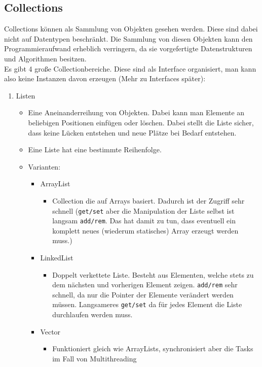 \documentclass{article}
\begin{document}
	\subsection{Collections}
	Collections können als Sammlung von Objekten gesehen werden. Diese sind dabei nicht auf Datentypen beschränkt. Die Sammlung von diesen Objekten kann den Programmieraufwand erheblich verringern, da sie vorgefertigte Datenstrukturen und Algorithmen besitzen. \\
	Es gibt 4 große Collectionbereiche. Diese sind als Interface organisiert, man kann also keine Instanzen davon erzeugen (Mehr zu Interfaces später):
	\begin{enumerate}
		\item{Listen}
		\begin{itemize}
			\item{Eine Aneinanderreihung von Objekten. Dabei kann man Elemente an beliebigen Positionen einfügen oder löschen. Dabei stellt die Liste sicher, dass keine Lücken entstehen und neue Plätze bei Bedarf entstehen.}
			\item{Eine Liste hat eine bestimmte Reihenfolge.}
			\item{Varianten:}
			\begin{itemize}
				\item{ArrayList}
				\begin{itemize}
					\item{Collection die auf Arrays basiert. Dadurch ist der Zugriff sehr schnell (\verb|get/set| aber die Manipulation der Liste selbst ist langsam \verb|add/rem|. Das hat damit zu tun, dass eventuell ein komplett neues (wiederum statisches) Array erzeugt werden muss.)}
				\end{itemize}
				\item{LinkedList}
				\begin{itemize}
					\item{Doppelt verkettete Liste. Besteht aus Elementen, welche stets zu dem nächsten und vorherigen Element zeigen. \verb|add/rem| sehr schnell, da nur die Pointer der Elemente verändert werden müssen. Langsameres \verb|get/set| da für jedes Element die Liste durchlaufen werden muss.}
				\end{itemize}
				\item{Vector}
				\begin{itemize}
					\item{Funktioniert gleich wie ArrayLists, synchronisiert aber die Tasks im Fall von Multithreading}
				\end{itemize}

\end{itemize}
\end{itemize}
\end{enumerate}
\end{document}
